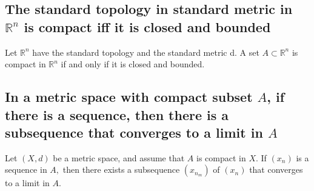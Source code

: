 \documentclass[12pt]{article}
\newcommand{\R}{\mathds{R}}
\begin{document}
	\subsection{The standard topology in standard metric in $ \R^n $ is compact iff it is closed and bounded}
	Let $\mathbb { R } ^ { n }$ have the standard topology and the standard metric
	d. A set $A \subset \mathbb { R } ^ { n }$ is compact in $\mathbb { R } ^ { n }$ if and only if it is closed and bounded.
	
	\subsection{In a metric space with compact subset $ A $, if there is a sequence, then there is a subsequence that converges to a limit in $ A $}
	Let $( X , d )$ be a metric space, and assume that $A$ is compact in $X .$ If $\left( x _ { n } \right)$ is a sequence in $A ,$ then there exists a subsequence $\left( x _ { n _ { m } } \right)$ of $\left( x _ { n } \right)$
	that converges to a limit in $A .$
\end{document}
